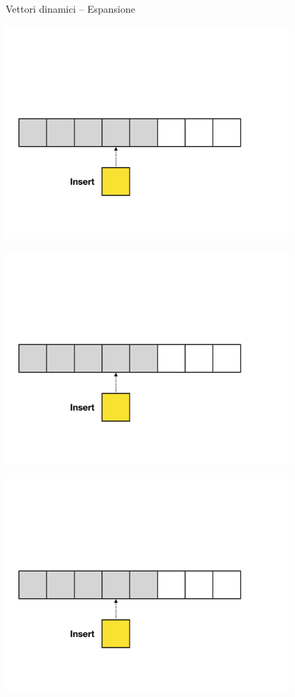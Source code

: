 \begin{frame}{Vettori dinamici -- Espansione}
\begin{overprint}
\centerline{\includegraphics[width=0.8\textwidth,page=3]{append-insert.pdf}}
\centerline{\includegraphics[width=0.8\textwidth,page=4]{append-insert.pdf}}
\centerline{\includegraphics[width=0.8\textwidth,page=5]{append-insert.pdf}}
\end{overprint}

\end{frame}

